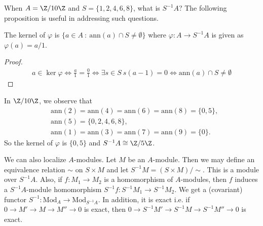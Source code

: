 \noindent
When $A = \Z/10\Z$ and $S = \{1,2,4,6,8\}$, what is $S^{-1}A$? The following proposition is useful in addressing such questions.
\begin{proposition}
    The kernel of $\varphi$ is $\{a \in A \ : \ \mathrm{ann}(a) \cap S \neq \emptyset\}$ where $\varphi: A \rightarrow S^{-1}A$ is given as $\varphi(a) = a/1$.
\end{proposition}
\begin{proof}
    \begin{align*}
        a \in \ker \varphi \Leftrightarrow \frac{a}{1} = \frac{0}{1} \Leftrightarrow \exists s\in S \ s(a-1) = 0 \Leftrightarrow \mathrm{ann}(a) \cap S \neq \emptyset
    \end{align*}
\end{proof}
\noindent
In $\Z/10\Z$, we observe that
\begin{align*}
    &\mathrm{ann}(2) = \mathrm{ann}(4) = \mathrm{ann}(6) = \mathrm{ann}(8) = \{0, 5\},\\
    &\mathrm{ann}(5) = \{0,2,4,6,8\},\\
    &\mathrm{ann}(1) = \mathrm{ann}(3) = \mathrm{ann}(7) = \mathrm{ann}(9) = \{0\}.
\end{align*}
So the kernel of $\varphi$ is $\{0,5\}$ and $S^{-1}A \cong \Z/5\Z$.

We can also localize $A$-modules. Let $M$ be an $A$-module. Then we may define an equivalence relation $\sim$ on $S \times M$ and let $S^{-1}M = (S \times M)/\sim$. This is a module over $S^{-1}A$. Also, if $f: M_1 \rightarrow M_2$ is a homomorphism of $A$-modules, then $f$ induces a $S^{-1}A$-module homomorphism $S^{-1}f: S^{-1}M_1 \rightarrow S^{-1}M_2$. We get a (covariant) functor $S^{-1}: \mathrm{Mod}_A \rightarrow \mathrm{Mod}_{S^{-1}A}$. In addition, it is exact i.e. if $0 \rightarrow M' \rightarrow M \rightarrow M'' \rightarrow 0$ is exact, then $0 \rightarrow S^{-1}M' \rightarrow S^{-1}M \rightarrow S^{-1}M'' \rightarrow 0$ is exact.

\clearpage